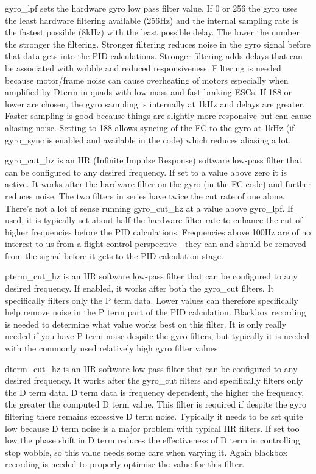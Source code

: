 {\ttfamily gyro\+\_\+lpf} sets the hardware gyro low pass filter value. If 0 or 256 the gyro uses the least hardware filtering available (256\+Hz) and the internal sampling rate is the fastest possible (8k\+Hz) with the least possible delay. The lower the number the stronger the filtering. Stronger filtering reduces noise in the gyro signal before that data gets into the P\+I\+D calculations. Stronger filtering adds delays that can be associated with wobble and reduced responsiveness. Filtering is needed because motor/frame noise can cause overheating of motors especially when amplified by Dterm in quads with low mass and fast braking E\+S\+Cs. If 188 or lower are chosen, the gyro sampling is internally at 1k\+Hz and delays are greater. Faster sampling is good because things are slightly more responsive but can cause aliasing noise. Setting to 188 allows syncing of the F\+C to the gyro at 1k\+Hz (if {\ttfamily gyro\+\_\+sync} is enabled and available in the code) which reduces aliasing a lot.

{\ttfamily gyro\+\_\+cut\+\_\+hz} is an I\+I\+R (Infinite Impulse Response) software low-\/pass filter that can be configured to any desired frequency. If set to a value above zero it is active. It works after the hardware filter on the gyro (in the F\+C code) and further reduces noise. The two filters in series have twice the cut rate of one alone. There's not a lot of sense running {\ttfamily gyro\+\_\+cut\+\_\+hz} at a value above {\ttfamily gyro\+\_\+lpf}. If used, it is typically set about half the hardware filter rate to enhance the cut of higher frequencies before the P\+I\+D calculations. Frequencies above 100\+Hz are of no interest to us from a flight control perspective -\/ they can and should be removed from the signal before it gets to the P\+I\+D calculation stage.

{\ttfamily pterm\+\_\+cut\+\_\+hz} is an I\+I\+R software low-\/pass filter that can be configured to any desired frequency. If enabled, it works after both the gyro\+\_\+cut filters. It specifically filters only the P term data. Lower values can therefore specifically help remove noise in the P term part of the P\+I\+D calculation. Blackbox recording is needed to determine what value works best on this filter. It is only really needed if you have P term noise despite the gyro filters, but typically it is needed with the commonly used relatively high gyro filter values.

{\ttfamily dterm\+\_\+cut\+\_\+hz} is an I\+I\+R software low-\/pass filter that can be configured to any desired frequency. It works after the gyro\+\_\+cut filters and specifically filters only the D term data. D term data is frequency dependent, the higher the frequency, the greater the computed D term value. This filter is required if despite the gyro filtering there remains excessive D term noise. Typically it needs to be set quite low because D term noise is a major problem with typical I\+I\+R filters. If set too low the phase shift in D term reduces the effectiveness of D term in controlling stop wobble, so this value needs some care when varying it. Again blackbox recording is needed to properly optimise the value for this filter. 